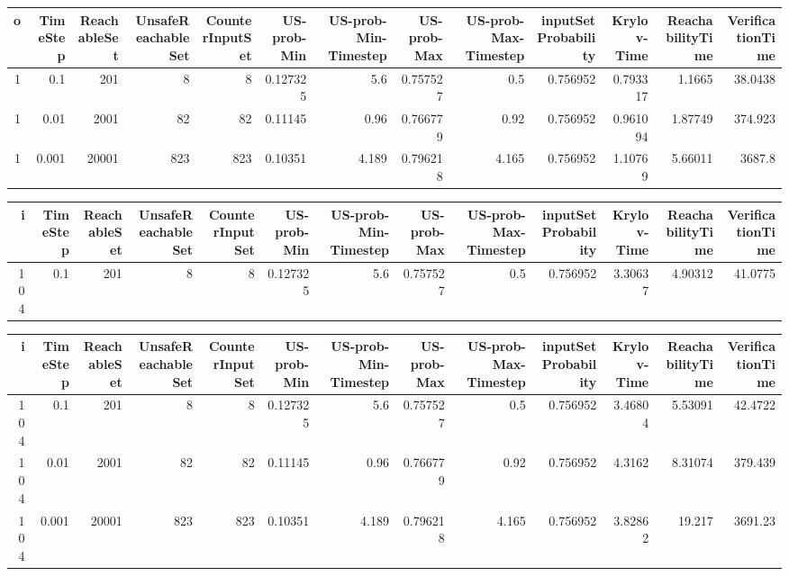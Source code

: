 \begin{tabular}{rrrrrrrrrrrrr}
\hline
   o &   TimeStep &   ReachableSet &   UnsafeReachableSet &   CounterInputSet &   US-prob-Min &   US-prob-Min-Timestep &   US-prob-Max &   US-prob-Max-Timestep &   inputSet Probability &   Krylov-Time &   ReachabilityTime &   VerificationTime \\
\hline
   1 &      0.1   &            201 &                    8 &                 8 &      0.127325 &                  5.6   &      0.757527 &                  0.5   &               0.756952 &      0.793317 &            1.1665  &            38.0438 \\
   1 &      0.01  &           2001 &                   82 &                82 &      0.11145  &                  0.96  &      0.766779 &                  0.92  &               0.756952 &      0.961094 &            1.87749 &           374.923  \\
   1 &      0.001 &          20001 &                  823 &               823 &      0.10351  &                  4.189 &      0.796218 &                  4.165 &               0.756952 &      1.10769  &            5.66011 &          3687.8    \\
\hline
\end{tabular}
\begin{tabular}{rrrrrrrrrrrrr}
\hline
   i &   TimeStep &   ReachableSet &   UnsafeReachableSet &   CounterInputSet &   US-prob-Min &   US-prob-Min-Timestep &   US-prob-Max &   US-prob-Max-Timestep &   inputSet Probability &   Krylov-Time &   ReachabilityTime &   VerificationTime \\
\hline
 104 &        0.1 &            201 &                    8 &                 8 &      0.127325 &                    5.6 &      0.757527 &                    0.5 &               0.756952 &       3.30637 &            4.90312 &            41.0775 \\
\hline
\end{tabular}
\begin{tabular}{rrrrrrrrrrrrr}
\hline
   i &   TimeStep &   ReachableSet &   UnsafeReachableSet &   CounterInputSet &   US-prob-Min &   US-prob-Min-Timestep &   US-prob-Max &   US-prob-Max-Timestep &   inputSet Probability &   Krylov-Time &   ReachabilityTime &   VerificationTime \\
\hline
 104 &      0.1   &            201 &                    8 &                 8 &      0.127325 &                  5.6   &      0.757527 &                  0.5   &               0.756952 &       3.46804 &            5.53091 &            42.4722 \\
 104 &      0.01  &           2001 &                   82 &                82 &      0.11145  &                  0.96  &      0.766779 &                  0.92  &               0.756952 &       4.3162  &            8.31074 &           379.439  \\
 104 &      0.001 &          20001 &                  823 &               823 &      0.10351  &                  4.189 &      0.796218 &                  4.165 &               0.756952 &       3.82862 &           19.217   &          3691.23   \\
\hline
\end{tabular}
